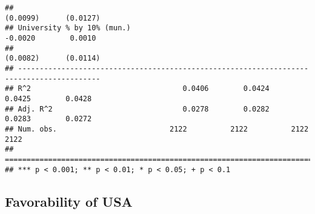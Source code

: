 \documentclass[
]{article}
\begin{document}
\begin{verbatim}
##                                                                  (0.0099)      (0.0127)  
## University % by 10% (mun.)                                       -0.0020        0.0010   
##                                                                  (0.0082)      (0.0114)  
## -----------------------------------------------------------------------------------------
## R^2                                   0.0406        0.0424        0.0425        0.0428   
## Adj. R^2                              0.0278        0.0282        0.0283        0.0272   
## Num. obs.                          2122          2122          2122          2122        
## =========================================================================================
## *** p < 0.001; ** p < 0.01; * p < 0.05; + p < 0.1
\end{verbatim}

\hypertarget{favorability-of-usa-2}{%
\subsection{Favorability of USA}\label{favorability-of-usa-2}}
\end{document}
